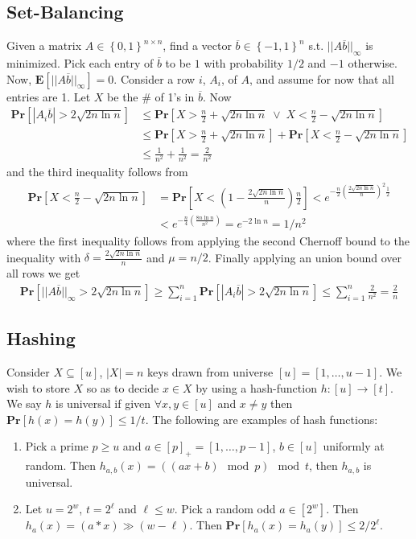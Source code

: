 \documentclass[12pt]{article}
\begin{document}
\subsection*{Set-Balancing}
Given a matrix $A \in \left\{ 0,1 \right\}^{n \times n}$, find a vector $\overline{b} \in \left\{ -1, 1 \right\}^n$ s.t. $|| A\overline{b} ||_{\infty}$ is minimized. Pick each entry of $\overline{b}$ to be $1$ with probability $1/2$ and $-1$ otherwise. Now, $\mathbf{E} \left[ || A\overline{b} ||_{\infty} \right] = 0$. Consider a row $i$, $A_{i}$, of $A$, and assume for now that all entries are 1. Let $X$ be the \# of 1's in $\overline{b}$. Now
\begin{align*}
\mathbf{Pr} \left[ | A_i\overline{b} | > 2\sqrt{2n \ln n} \right] &\leq \mathbf{Pr} \left[ X > \frac{n}{2} + \sqrt{2n \ln n} \; \lor \; X < \frac{n}{2} - \sqrt{2n \ln n} \right] \\
&\leq \mathbf{Pr} \left[ X > \frac{n}{2} + \sqrt{2n \ln n} \right] + \mathbf{Pr} \left[ X < \frac{n}{2} - \sqrt{2n \ln n} \right] \\
&\leq \frac{1}{n^2} + \frac{1}{n^2} = \frac{2}{n^2}
\end{align*}
and the third inequality follows from
\begin{align*}
\mathbf{Pr} \left[ X < \frac{n}{2} - \sqrt{2n \ln n} \right]
&= \mathbf{Pr} \left[ X < \left( 1 - \frac{2\sqrt{2n \ln n}}{n} \right)\frac{n}{2} \right]
< e^{-\frac{n}{2} \left( \frac{2\sqrt{2n \ln n}}{n}\right)^2\frac{1}{2}} \\
&< e^{-\frac{n}{4} \left( \frac{8n \ln n}{n^2}\right)} = e^{-2\ln n} = 1/n^2
\end{align*}
where the first inequality follows from applying the second Chernoff bound to the inequality with $\delta=\frac{2\sqrt{2n \ln n}}{n}$ and $\mu=n/2$. Finally applying an union bound over all rows we get
\begin{align*}
\mathbf{Pr} \left[ || A\overline{b} ||_{\infty} > 2\sqrt{2n \ln n} \right] \geq \sum_{i=1}^n \mathbf{Pr} \left[ | A_i\overline{b} | > 2\sqrt{2n \ln n} \right] \leq \sum_{i=1}^n \frac{2}{n^2} = \frac{2}{n}
\end{align*}

\subsection*{Hashing}
Consider $X \subseteq [u]$, $|X| = n$ keys drawn from universe $[u] = [1, \hdots, u-1]$. We wish to store $X$ so as to decide $x \in X$ by using a hash-function $h : [u] \rightarrow [t]$. We say $h$ is universal if given $\forall x,y \in [u]$ and $x \neq y$ then $\mathbf{Pr}\left[ h(x) = h(y) \right] \leq 1/t$. The following are examples of hash functions:
\begin{enumerate}
\item Pick a prime $p \geq u$ and $a \in [p]_+ = [1, \hdots, p-1]$, $b \in [u]$ uniformly at random. Then $h_{a,b}(x) = ((ax + b) \mod p) \mod t$, then $h_{a,b}$ is universal.
\item Let $u=2^w$, $t=2^\ell$ and $\ell \leq w$. Pick a random odd $a \in [2^w]$. Then $h_a(x) = (a * x) \gg (w - \ell)$. Then $\mathbf{Pr}\left[ h_a(x) = h_a(y) \right] \leq 2/2^\ell$.
\end{enumerate}
\end{document}
